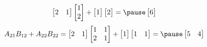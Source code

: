 \documentclass{beamer}
\theoremstyle{definition}
\theoremstyle{remark}
\begin{document}
\begin{frame}[t]
\begin{example}
\[\begin{bmatrix}
2&1
\end{bmatrix}\begin{bmatrix}
1\\2
\end{bmatrix}+\begin{bmatrix}
1
\end{bmatrix}\begin{bmatrix}
2
\end{bmatrix}=\pause\begin{bmatrix}
6
\end{bmatrix}
\]
\[
A_{21}B_{12}+A_{22}B_{22}=\begin{bmatrix}
2&1
\end{bmatrix}\begin{bmatrix}
1&1\\
2&1
\end{bmatrix}+\begin{bmatrix}
1
\end{bmatrix}\begin{bmatrix}
1&1
\end{bmatrix}=\pause\begin{bmatrix}
5&4
\end{bmatrix}
\]
\begin{center}
\vspace{-10mm}
\end{center}
\end{example}
\end{frame}
\end{document}
